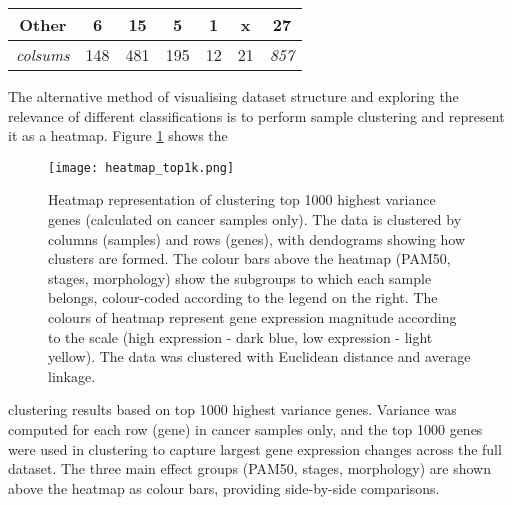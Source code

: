 \begin{table}[!h]
\begin{tabular}{ccccccc}
                \multicolumn{1}{c|}{\textbf{Other}} & \multicolumn{1}{c|}{6} & \multicolumn{1}{c|}{15} & \multicolumn{1}{c|}{5} & \multicolumn{1}{c|}{1} & \multicolumn{1}{c|}{{\color[HTML]{656565} x}} & \multicolumn{1}{c|}{{\color[HTML]{656565} 27}} \\ \hline
                \multicolumn{1}{c|}{{\color[HTML]{9B9B9B} \textit{colsums}}} &
                \multicolumn{1}{c|}{{\color[HTML]{656565} 148}} & \multicolumn{1}{c|}{{\color[HTML]{656565} 481}} & \multicolumn{1}{c|}{{\color[HTML]{656565} 195}} & \multicolumn{1}{c|}{{\color[HTML]{656565} 12}} & \multicolumn{1}{c|}{{\color[HTML]{656565} 21}} & \multicolumn{1}{c|}{\textit{857}} \\ \cline{2-7} 
                
                \end{tabular}%
                \end{table}
        

    The alternative method of visualising dataset structure and exploring the relevance of different classifications is to perform sample clustering and represent it as a heatmap. Figure \ref{fig:heatmap1k} shows the
    
            \begin{figure}[!h]
            \centering
            \texttt{[image: heatmap\_top1k.png]}
            \caption[Heatmap clustering of top genes with highest variance]{Heatmap representation of clustering top 1000 highest variance genes (calculated on cancer samples only). The data is clustered by columns (samples) and rows (genes), with dendograms showing how clusters are formed. The colour bars above the heatmap (PAM50, stages, morphology) show the subgroups to which each sample belongs, colour-coded according to the legend on the right. The colours of heatmap represent gene expression magnitude according to the scale (high expression - dark blue, low expression - light yellow). The data was clustered with Euclidean distance and average linkage. }
            \label{fig:heatmap1k}
            \end{figure}
            
   clustering results based on top 1000 highest variance genes. Variance was computed for each row (gene) in cancer samples only, and the top 1000 genes were used in clustering to capture largest gene expression changes across the full dataset. The three main effect groups (PAM50, stages, morphology) are shown above the heatmap as colour bars, providing side-by-side comparisons.     
   
